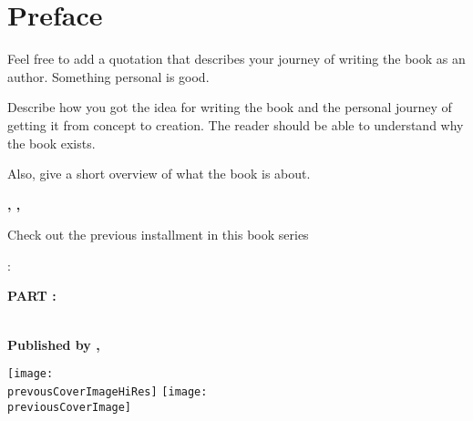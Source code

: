 

\chapter{Preface}\label{preface:cha}

\begin{myquotation}
Feel free to add a quotation that describes your journey of writing the book as an author. Something personal is good.\end{myquotation}

Describe how you got the idea for writing the book and the personal journey of getting it from concept to creation. The reader should be able to understand why the book exists.

Also, give a short overview of what the book is about.

\noindent \textbf{\yourName}

\textbf{\yourCity, \yourCountry, \prefaceDate}



\hfil{}\hfil

\ifseries

\begin{center}
	
Check out the previous installment in this book series \bfseries \sffamily \LARGE \titleOfTheBookSeries\par:

\bfseries \Large PART \partPreviousPart: \titlePreviousPart\par
{}

~\\
\bfseries \small Published by \mypublishingcompany, \mypublishingcompanylocation\par

\ifxetex
    \texttt{[image: \\prevousCoverImageHiRes]}
\else
    \texttt{[image: \\previousCoverImage]}
\fi
\end{center}
\fi
